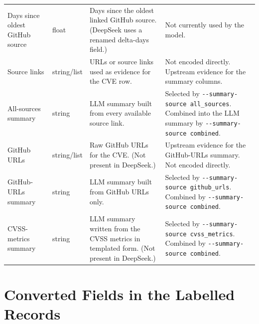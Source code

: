 \documentclass[11pt]{article}
\begin{document}
\begin{longtable}{p{}p{}p{}p{}}
Days since oldest GitHub source & float & Days since the oldest linked GitHub source. (DeepSeek uses a renamed delta-days field.) & Not currently used by the model. \\

Source links & string/list & URLs or source links used as evidence for the CVE row. & Not encoded directly. Upstream evidence for the summary columns. \\

All-sources summary & string & LLM summary built from every available source link. & Selected by \verb|--summary-source all_sources|. Combined into the LLM summary by \verb|--summary-source combined|. \\

GitHub URLs & string/list & Raw GitHub URLs for the CVE. (Not present in DeepSeek.) & Upstream evidence for the GitHub-URLs summary. Not encoded directly. \\

GitHub-URLs summary & string & LLM summary built from GitHub URLs only. & Selected by \verb|--summary-source github_urls|. Combined by \verb|--summary-source combined|. \\

CVSS-metrics summary & string & LLM summary written from the CVSS metrics in templated form. (Not present in DeepSeek.) & Selected by \verb|--summary-source cvss_metrics|. Combined by \verb|--summary-source combined|. \\

\end{longtable}
\normalsize

\section{Converted Fields in the Labelled Records}
\end{document}
